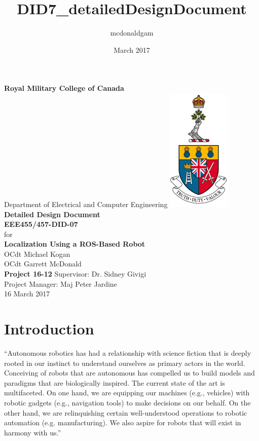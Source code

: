 \documentclass{article}
\title{DID7_detailedDesignDocument}
\author{mcdonaldgam }
\date{March 2017}
\newcommand\tab[1][0.5cm]{\hspace*{#1}}
\begin{document}
\begin{titlepage}
    \begin{center}
        \vspace*{1cm}
        \textbf{Royal Military College of Canada}\\
        \vspace{0.5cm}
        Department of Electrical and Computer Engineering
        \vfill
        \includegraphics[scale=1]{tdv_logo}
        \vfill
        \textbf{Detailed Design Document}\\
        \textbf{EEE455/457-DID-07}\\
        for\\
        \textbf{Localization Using a ROS-Based Robot}\\
        \vfill
        OCdt Michael Kogan\\
        OCdt Garrett McDonald\\
        \vfill
        \textbf{Project 16-12}
        \vfill
        Supervisor: Dr. Sidney Givigi\\
        Project Manager: Maj Peter Jardine\\
        16 March 2017
        \vspace*{1cm}
    \end{center}
\end{titlepage}

\tableofcontents

\clearpage
\section{Introduction}
\tab ``Autonomous robotics has had a relationship with science fiction that is deeply rooted in our instinct to understand ourselves as primary actors in the world. Conceiving of robots that are autonomous has compelled us to build models and paradigms that are biologically inspired. The current state of the art is multifaceted. On one hand, we are equipping our machines (e.g., vehicles) with robotic gadgets (e.g., navigation tools) to make decisions on our behalf. On the other hand, we are relinquishing certain well-understood operations to robotic automation (e.g. manufacturing). We also aspire for robots that will exist in harmony with us.''
\citep{EPAR}\\
\end{document}
